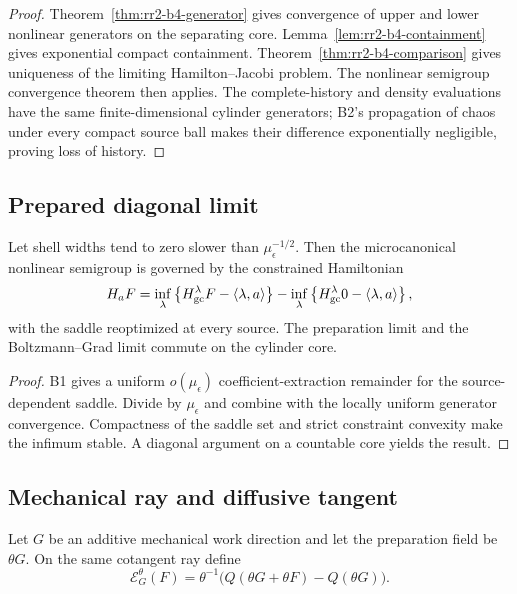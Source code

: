 \begin{proof}
Theorem~\ref{thm:rr2-b4-generator} gives convergence of upper and lower
nonlinear generators on the separating core.  Lemma~\ref{lem:rr2-b4-containment}
gives exponential compact containment.  Theorem~\ref{thm:rr2-b4-comparison}
gives uniqueness of the limiting Hamilton--Jacobi problem.  The nonlinear
semigroup convergence theorem then applies.  The complete-history and
density evaluations have the same finite-dimensional cylinder generators;
B2's propagation of chaos under every compact source ball makes their
difference exponentially negligible, proving loss of history.
\end{proof}

\subsection{Prepared diagonal limit}

\begin{theorem}
\label{thm:rr2-b4-diagonal}
Let shell widths tend to zero slower than
\(\mu_\epsilon^{-1/2}\).  Then the microcanonical nonlinear semigroup is
governed by the constrained Hamiltonian
\[
 H_aF
 =
 \inf_\lambda
 \left\{
 H_{\rm gc}^{\lambda}F-\langle\lambda,a\rangle
 \right\}
 -
 \inf_\lambda
 \left\{
 H_{\rm gc}^{\lambda}0-\langle\lambda,a\rangle
 \right\},
\]
with the saddle reoptimized at every source.  The preparation limit and the
Boltzmann--Grad limit commute on the cylinder core.
\end{theorem}

\begin{proof}
B1 gives a uniform \(o(\mu_\epsilon)\) coefficient-extraction remainder for
the source-dependent saddle.  Divide by \(\mu_\epsilon\) and combine with
the locally uniform generator convergence.  Compactness of the saddle set
and strict constraint convexity make the infimum stable.  A diagonal
argument on a countable core yields the result.
\end{proof}

\subsection{Mechanical ray and diffusive tangent}

Let \(G\) be an additive mechanical work direction and let the preparation
field be \(\theta G\).  On the same cotangent ray define
\[
 \mathcal E_G^\theta(F)=
 \theta^{-1}\big(Q(\theta G+\theta F)-Q(\theta G)\big).
\]


